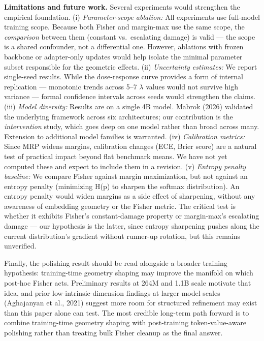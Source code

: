 \documentclass[
  11pt,
]{article}
\begin{document}
\textbf{Limitations and future work.} Several experiments would
strengthen the empirical foundation. (i) \emph{Parameter-scope
ablation:} All experiments use full-model training scope. Because both
Fisher and margin-max use the same scope, the \emph{comparison} between
them (constant vs.~escalating damage) is valid --- the scope is a shared
confounder, not a differential one. However, ablations with frozen
backbone or adapter-only updates would help isolate the minimal
parameter subset responsible for the geometric effects. (ii)
\emph{Uncertainty estimates:} We report single-seed results. While the
dose-response curve provides a form of internal replication ---
monotonic trends across 5--7 $\lambda$ values would not survive high variance
--- formal confidence intervals across seeds would strengthen the
claims. (iii) \emph{Model diversity:} Results are on a single 4B model.
Mabrok (2026) validated the underlying framework across six
architectures; our contribution is the \emph{intervention} study, which
goes deep on one model rather than broad across many. Extension to
additional model families is warranted. (iv) \emph{Calibration metrics:}
Since MRP widens margins, calibration changes (ECE, Brier score) are a
natural test of practical impact beyond flat benchmark means. We have
not yet computed these and expect to include them in a revision. (v)
\emph{Entropy penalty baseline:} We compare Fisher against margin
maximization, but not against an entropy penalty (minimizing H(p) to
sharpen the softmax distribution). An entropy penalty would widen
margins as a side effect of sharpening, without any awareness of
embedding geometry or the Fisher metric. The critical test is whether it
exhibits Fisher's constant-damage property or margin-max's escalating
damage --- our hypothesis is the latter, since entropy sharpening pushes
along the current distribution's gradient without runner-up rotation,
but this remains unverified.

Finally, the polishing result should be read alongside a broader
training hypothesis: training-time geometry shaping may improve the
manifold on which post-hoc Fisher acts. Preliminary results at 264M and
1.1B scale motivate that idea, and prior low-intrinsic-dimension
findings at larger model scales (Aghajanyan et al., 2021) suggest more
room for structured refinement may exist than this paper alone can test.
The most credible long-term path forward is to combine training-time
geometry shaping with post-training token-value-aware polishing rather
than treating bulk Fisher cleanup as the final answer.
\end{document}
